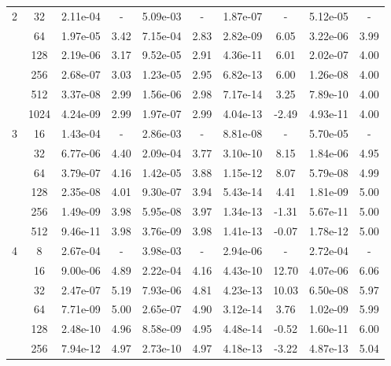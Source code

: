 \begin{table}[htbp]
\begin{center}
\begin{tabular}{| c | c | c c | c c | c c | c c |}
			\hline

			2	& 32 & 2.11e-04 & - & 5.09e-03 & - & 1.87e-07 & - & 5.12e-05 & - \\
				& 64 & 1.97e-05 & 3.42 & 7.15e-04 & 2.83 & 2.82e-09 & 6.05 & 3.22e-06 & 3.99 \\
				& 128 & 2.19e-06 & 3.17 & 9.52e-05 & 2.91 & 4.36e-11 & 6.01 & 2.02e-07 & 4.00 \\
				& 256 & 2.68e-07 & 3.03 & 1.23e-05 & 2.95 & 6.82e-13 & 6.00 & 1.26e-08 & 4.00 \\
				& 512 & 3.37e-08 & 2.99 & 1.56e-06 & 2.98 & 7.17e-14 & 3.25 & 7.89e-10 & 4.00 \\
				& 1024 & 4.24e-09 & 2.99 & 1.97e-07 & 2.99 & 4.04e-13 & -2.49 & 4.93e-11 & 4.00 \\

			\hline

			3	& 16 & 1.43e-04 & - & 2.86e-03 & - & 8.81e-08 & - & 5.70e-05 & - \\
				& 32 & 6.77e-06 & 4.40 & 2.09e-04 & 3.77 & 3.10e-10 & 8.15 & 1.84e-06 & 4.95 \\
				& 64 & 3.79e-07 & 4.16 & 1.42e-05 & 3.88 & 1.15e-12 & 8.07 & 5.79e-08 & 4.99 \\
				& 128 & 2.35e-08 & 4.01 & 9.30e-07 & 3.94 & 5.43e-14 & 4.41 & 1.81e-09 & 5.00 \\
				& 256 & 1.49e-09 & 3.98 & 5.95e-08 & 3.97 & 1.34e-13 & -1.31 & 5.67e-11 & 5.00 \\
				& 512 & 9.46e-11 & 3.98 & 3.76e-09 & 3.98 & 1.41e-13 & -0.07 & 1.78e-12 & 5.00 \\

			\hline

			4	& 8 & 2.67e-04 & - & 3.98e-03 & - & 2.94e-06 & - & 2.72e-04 & - \\
				& 16 & 9.00e-06 & 4.89 & 2.22e-04 & 4.16 & 4.43e-10 & 12.70 & 4.07e-06 & 6.06 \\
				& 32 & 2.47e-07 & 5.19 & 7.93e-06 & 4.81 & 4.23e-13 & 10.03 & 6.50e-08 & 5.97 \\
				& 64 & 7.71e-09 & 5.00 & 2.65e-07 & 4.90 & 3.12e-14 & 3.76 & 1.02e-09 & 5.99 \\
				& 128 & 2.48e-10 & 4.96 & 8.58e-09 & 4.95 & 4.48e-14 & -0.52 & 1.60e-11 & 6.00 \\
				& 256 & 7.94e-12 & 4.97 & 2.73e-10 & 4.97 & 4.18e-13 & -3.22 & 4.87e-13 & 5.04 \\

			\hline
		\end{tabular}
	\end{center}
\end{table}

